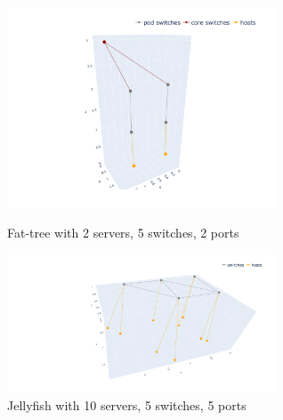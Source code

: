\documentclass[a4paper,11pt]{article}
\begin{document}
    \begin{figure}[htbp]
    \centering
    \begin{minipage}[t]{0.48\textwidth}
    \centering
    \includegraphics[width=8cm]{fattree_k2.png}
    \caption{Fat-tree with 2 servers, 5 switches, 2 ports}
    \end{minipage}
    \begin{minipage}[t]{0.48\textwidth}
    \centering
    \includegraphics[width=8cm]{jellyfish_k2.png}
    \caption{Jellyfish with 10 servers, 5 switches, 5 ports}
    \end{minipage}
    \end{figure}
\end{document}
